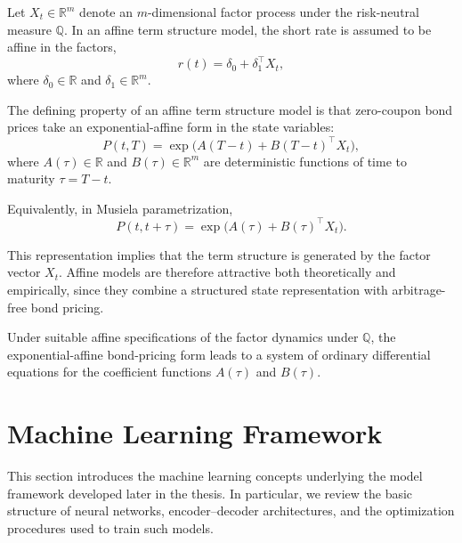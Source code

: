 Let $X_t \in \mathbb{R}^m$ denote an $m$-dimensional factor process under the risk-neutral measure $\mathbb{Q}$. In an affine term structure model, the short rate is assumed to be affine in the factors,
\begin{equation}
r(t) = \delta_0 + \delta_1^\top X_t,
\label{eq:atsm_short_rate}
\end{equation}
where $\delta_0 \in \mathbb{R}$ and $\delta_1 \in \mathbb{R}^m$.

The defining property of an affine term structure model is that zero-coupon bond prices take an exponential-affine form in the state variables:
\begin{equation}
P(t,T)
=
\exp \bigl(
A(T-t) + B(T-t)^\top X_t
\bigr),
\label{eq:affine_form}
\end{equation}
where $A(\tau) \in \mathbb{R}$ and $B(\tau) \in \mathbb{R}^m$ are deterministic functions of time to maturity $\tau=T-t$.

Equivalently, in Musiela parametrization,
\begin{equation}
P(t,t+\tau)
=
\exp \bigl(
A(\tau) + B(\tau)^\top X_t
\bigr).
\label{eq:affine_form_musiela}
\end{equation}

This representation implies that the term structure is generated by the factor vector $X_t$. Affine models are therefore attractive both theoretically and empirically, since they combine a structured state representation with arbitrage-free bond pricing.

Under suitable affine specifications of the factor dynamics under $\mathbb{Q}$, the exponential-affine bond-pricing form leads to a system of ordinary differential equations for the coefficient functions $A(\tau)$ and $B(\tau)$. 


\section{Machine Learning Framework}
\label{sec:machine_learning_theory}

This section introduces the machine learning concepts underlying the model framework developed later in the thesis. In particular, we review the basic structure of neural networks, encoder--decoder architectures, and the optimization procedures used to train such models.

